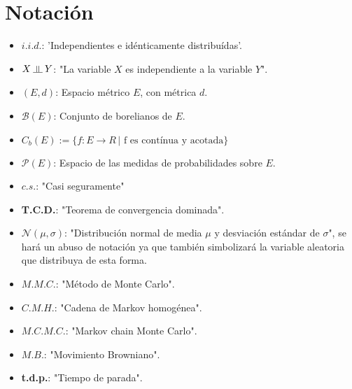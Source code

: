 \section{Notación}
\begin{itemize}
    \item $i.i.d.$: 'Independientes e idénticamente distribuídas'.
    \item $X \indep Y$: "La variable $X$ es independiente a la variable $Y$".
    \item $(E,d)$: Espacio métrico $E$, con métrica $d$.
    \item $\mathcal{B}(E)$: Conjunto de borelianos de $E$.
    \item $C_b (E) := \{f:E \rightarrow R \,| \text{ f es contínua y acotada}\}$
    \item $\mathcal{P}(E)$: Espacio de las medidas de probabilidades sobre $E$.
    \item $c.s.$: "Casi seguramente"
    \item \textbf{T.C.D.}: "Teorema de convergencia  dominada".
    \item $\mathcal{N}(\mu,\sigma)$: "Distribución normal de media $\mu$ y desviación estándar de $\sigma$", se hará un abuso de notación ya que también simbolizará la variable aleatoria que distribuya de esta forma.
    \item $M.M.C.$: "Método de Monte Carlo".
    \item $C.M.H.$: "Cadena de Markov homogénea".
    \item $M.C.M.C.$: "Markov chain Monte Carlo".
    \item $M.B.$: "Movimiento Browniano".
    \item \textbf{t.d.p.}: "Tiempo de parada".
\end{itemize}